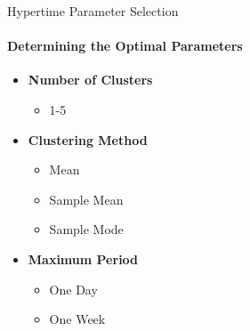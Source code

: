 \documentclass{beamer}
\begin{document}
\begin{frame}[t]{Hypertime Parameter Selection}
  \framesubtitle{Determining the Optimal Parameters}
  \begin{itemize}
    \setlength\itemsep{1em}

  \item \textbf{Number of Clusters}
    \begin{itemize}
      \item 1-5
    \end{itemize}
  \item \textbf{Clustering Method}
    \begin{itemize}
      \item Mean
      \item Sample Mean
      \item Sample Mode
    \end{itemize}
  \item \textbf{Maximum Period}
    \begin{itemize}
      \item One Day
      \item One Week
    \end{itemize}
  \end{itemize}
\end{frame}
\end{document}

